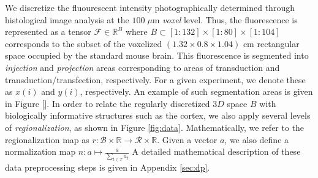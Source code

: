 We discretize the fluourescent intensity photographically determined through histological image analysis  at the $100 \; \mu$m \textit{voxel} level.
Thus, the fluorescence is represented as a tensor $\mathcal F \in  \mathbb R^B$ where $B \subset [1:132] \times [1:80] \times [1:104]$ corresponds to the subset of the voxelized $(1.32 \times 0.8 \times 1.04)$ cm rectangular space occupied by the standard mouse brain.
This fluorescence is segmented into \textit{injection} and \textit{projection} areas corresponding to areas of transduction and transduction/transfection, respectively.
For a given experiment, we denote these as $x(i)$ and $y(i)$, respectively.
An example of such segmentation areas is given in Figure \ref{}.
In order to relate the regularly discretized $3D$ space $B$ with biologically informative structures such as the cortex, we also apply several levels of  \textit{regionalization}, as shown in Figure \ref{fig:data}.
Mathematically, we refer to the regionalization map as $r: \mathcal B \times \mathbb R \to \mathcal R \times \mathbb R$.
Given a vector $a$, we also define a normalization map $n: a \mapsto \frac{a}{\sum_{t \in T} a_t}$
A detailed mathematical description of these data preprocessing steps is given in Appendix \ref{sec:dp}.






%




